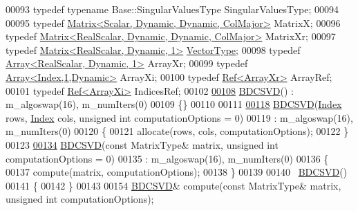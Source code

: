 \begin{DoxyCode}
00093   \textcolor{keyword}{typedef} \textcolor{keyword}{typename} Base::SingularValuesType SingularValuesType;
00094   
00095   \textcolor{keyword}{typedef} \hyperlink{group___core___module_class_eigen_1_1_matrix}{Matrix<Scalar, Dynamic, Dynamic, ColMajor>} MatrixX;
00096   \textcolor{keyword}{typedef} \hyperlink{group___core___module}{Matrix<RealScalar, Dynamic, Dynamic, ColMajor>} 
      MatrixXr;
00097   \textcolor{keyword}{typedef} \hyperlink{group___core___module}{Matrix<RealScalar, Dynamic, 1>} 
      \hyperlink{struct_vector_type}{VectorType};
00098   \textcolor{keyword}{typedef} \hyperlink{group___core___module}{Array<RealScalar, Dynamic, 1>} ArrayXr;
00099   \textcolor{keyword}{typedef} \hyperlink{group___core___module}{Array<Index,1,Dynamic>} ArrayXi;
00100   \textcolor{keyword}{typedef} \hyperlink{group___core___module_class_eigen_1_1_ref}{Ref<ArrayXr>} ArrayRef;
00101   \textcolor{keyword}{typedef} \hyperlink{group___core___module_class_eigen_1_1_ref}{Ref<ArrayXi>} IndicesRef;
00102 
\hyperlink{group___s_v_d___module_a39514816d38f9c418cf3f3514b511c2c}{00108}   \hyperlink{group___s_v_d___module_a39514816d38f9c418cf3f3514b511c2c}{BDCSVD}() : m\_algoswap(16), m\_numIters(0)
00109   \{\}
00110 
00111 
\hyperlink{group___s_v_d___module_a3e1fa48b3d042b7daf7392724a68bb60}{00118}   \hyperlink{group___s_v_d___module_a3e1fa48b3d042b7daf7392724a68bb60}{BDCSVD}(\hyperlink{namespace_eigen_a62e77e0933482dafde8fe197d9a2cfde}{Index} rows, \hyperlink{namespace_eigen_a62e77e0933482dafde8fe197d9a2cfde}{Index} cols, \textcolor{keywordtype}{unsigned} \textcolor{keywordtype}{int} computationOptions = 0)
00119     : m\_algoswap(16), m\_numIters(0)
00120   \{
00121     allocate(rows, cols, computationOptions);
00122   \}
00123 
\hyperlink{group___s_v_d___module_a302746d9c534cd513c1df87c7ae4850d}{00134}   \hyperlink{group___s_v_d___module_a302746d9c534cd513c1df87c7ae4850d}{BDCSVD}(\textcolor{keyword}{const} MatrixType& matrix, \textcolor{keywordtype}{unsigned} \textcolor{keywordtype}{int} computationOptions = 0)
00135     : m\_algoswap(16), m\_numIters(0)
00136   \{
00137     compute(matrix, computationOptions);
00138   \}
00139 
00140   ~\hyperlink{group___s_v_d___module_class_eigen_1_1_b_d_c_s_v_d}{BDCSVD}() 
00141   \{
00142   \}
00143   
00154   \hyperlink{group___s_v_d___module_class_eigen_1_1_b_d_c_s_v_d}{BDCSVD}& compute(\textcolor{keyword}{const} MatrixType& matrix, \textcolor{keywordtype}{unsigned} \textcolor{keywordtype}{int} computationOptions);

\end{DoxyCode}
